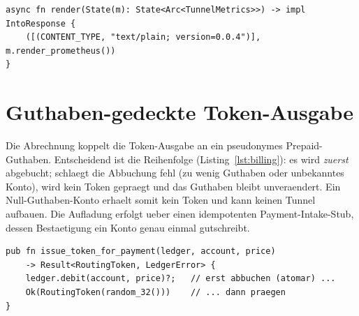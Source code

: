 \begin{lstlisting}[caption={Prometheus-Endpunkt (vereinfacht).},label=lst:metrics]
async fn render(State(m): State<Arc<TunnelMetrics>>) -> impl IntoResponse {
    ([(CONTENT_TYPE, "text/plain; version=0.0.4")], m.render_prometheus())
}
\end{lstlisting}

\section{Guthaben-gedeckte Token-Ausgabe}
\label{sec:impl-billing}

Die Abrechnung koppelt die Token-Ausgabe an ein pseudonymes Prepaid-Guthaben.
Entscheidend ist die Reihenfolge (Listing~\ref{lst:billing}): es wird
\emph{zuerst} abgebucht; schlaegt die Abbuchung fehl (zu wenig Guthaben oder
unbekanntes Konto), wird kein Token gepraegt und das Guthaben bleibt
unveraendert. Ein Null-Guthaben-Konto erhaelt somit kein Token und kann keinen
Tunnel aufbauen. Die Aufladung erfolgt ueber einen idempotenten
Payment-Intake-Stub, dessen Bestaetigung ein Konto genau einmal gutschreibt.

\begin{lstlisting}[caption={Guthaben-gedeckte Ausgabe (vereinfacht).},label=lst:billing]
pub fn issue_token_for_payment(ledger, account, price)
    -> Result<RoutingToken, LedgerError> {
    ledger.debit(account, price)?;   // erst abbuchen (atomar) ...
    Ok(RoutingToken(random_32()))    // ... dann praegen
}
\end{lstlisting}
